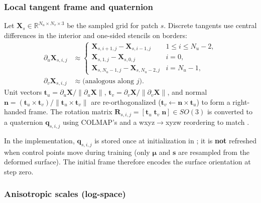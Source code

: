 \subsubsection{Local tangent frame and quaternion}
\label{subsubsec:init_quat}

Let $\mathbf{X}_s\in\mathbb{R}^{N_u\times N_v\times 3}$ be the sampled grid for patch $s$. Discrete tangents use central differences in the interior and one-sided stencils on borders:
\begin{align}
\partial_u \mathbf{X}_{s,i,j} &\approx
\begin{cases}
\mathbf{X}_{s,i+1,j}-\mathbf{X}_{s,i-1,j} & 1\le i\le N_u-2,\\
\mathbf{X}_{s,1,j}-\mathbf{X}_{s,0,j} & i=0,\\
\mathbf{X}_{s,N_u-1,j}-\mathbf{X}_{s,N_u-2,j} & i=N_u-1,
\end{cases}
\label{eq:fd_u}\\
\partial_v \mathbf{X}_{s,i,j} &\approx
\text{(analogous along $j$)}.
\label{eq:fd_v}
\end{align}
Unit vectors $\mathbf{t}_u=\partial_u\mathbf{X}/\|\partial_u\mathbf{X}\|$, $\mathbf{t}_v=\partial_v\mathbf{X}/\|\partial_v\mathbf{X}\|$, and normal $\mathbf{n}=(\mathbf{t}_u\times\mathbf{t}_v)/\|\mathbf{t}_u\times\mathbf{t}_v\|$ are re-orthogonalized ($\mathbf{t}_v\leftarrow \mathbf{n}\times\mathbf{t}_u$) to form a right-handed frame. The rotation matrix $\mathbf{R}_{s,i,j}=[\mathbf{t}_u\;\mathbf{t}_v\;\mathbf{n}]\in SO(3)$ is converted to a quaternion $\mathbf{q}_{s,i,j}$ using COLMAP's  and a wxyz$\rightarrow$xyzw reordering to match .

In the implementation, $\mathbf{q}_{s,i,j}$ is stored once at initialization in ; it is \textbf{not} refreshed when control points move during training (only $\boldsymbol{\mu}$ and $\mathbf{s}$ are resampled from the deformed surface). The initial frame therefore encodes the surface orientation at step zero.

\subsubsection{Anisotropic scales (log-space)}
\label{subsubsec:init_scales}

